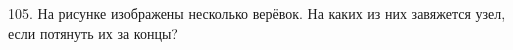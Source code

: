 105. На рисунке изображены несколько верёвок. На каких из них завяжется узел, если потянуть их за концы?
\begin{center}
\begin{figure}[ht!]
\end{figure}
\end{center}
